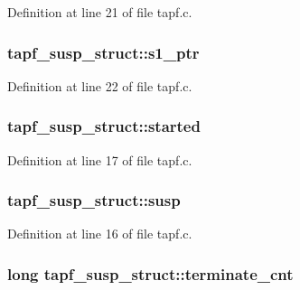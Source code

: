 Definition at line 21 of file tapf.\+c.

\subsubsection[{\texorpdfstring{s1\+\_\+ptr}{s1_ptr}}]{ tapf\+\_\+susp\+\_\+struct\+::s1\+\_\+ptr}\hypertarget{structtapf__susp__struct_aabf632a59ab6fecf08d942f223fb7f1b}{}\label{structtapf__susp__struct_aabf632a59ab6fecf08d942f223fb7f1b}


Definition at line 22 of file tapf.\+c.

\subsubsection[{\texorpdfstring{started}{started}}]{ tapf\+\_\+susp\+\_\+struct\+::started}\hypertarget{structtapf__susp__struct_a9fc475a2f452d8c8ddf993ed19d00d3c}{}\label{structtapf__susp__struct_a9fc475a2f452d8c8ddf993ed19d00d3c}


Definition at line 17 of file tapf.\+c.

\subsubsection[{\texorpdfstring{susp}{susp}}]{ tapf\+\_\+susp\+\_\+struct\+::susp}\hypertarget{structtapf__susp__struct_a5ba5860f7d828bc3961c00f095aeae24}{}\label{structtapf__susp__struct_a5ba5860f7d828bc3961c00f095aeae24}


Definition at line 16 of file tapf.\+c.

\subsubsection[{\texorpdfstring{terminate\+\_\+cnt}{terminate_cnt}}]{\setlength{\rightskip}{0pt plus 5cm}long tapf\+\_\+susp\+\_\+struct\+::terminate\+\_\+cnt}\hypertarget{structtapf__susp__struct_a735f0ede8d334d39fc7122a4ac48dd23}{}\label{structtapf__susp__struct_a735f0ede8d334d39fc7122a4ac48dd23}


